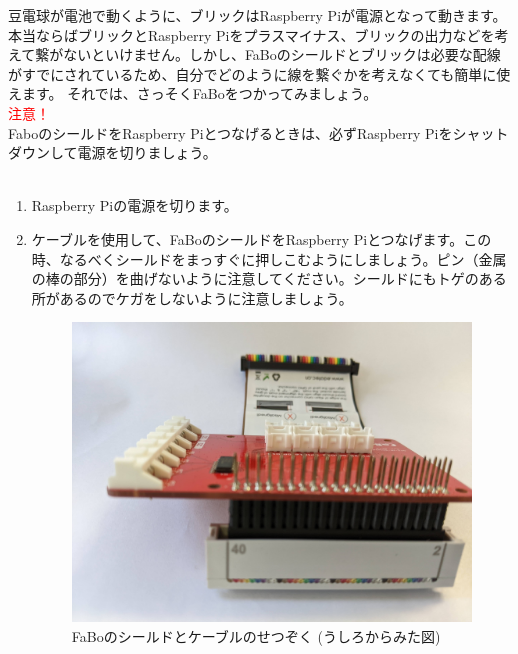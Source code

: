 豆電球が電池で動くように、ブリックはRaspberry Piが電源となって動きます。本当ならばブリックとRaspberry Piをプラスマイナス、ブリックの出力などを考えて繋がないといけません。しかし、FaBoのシールドとブリックは必要な配線がすでにされているため、自分でどのように線を繋ぐかを考えなくても簡単に使えます。
それでは、さっそくFaBoをつかってみましょう。\\

{\Large\textcolor{red}{注意！}}\\
FaboのシールドをRaspberry Piとつなげるときは、必ずRaspberry Piをシャットダウンして電源を切りましょう。\\
\\
\begin{enumerate}
\item Raspberry Piの電源を切ります。\\
\item ケーブルを使用して、FaBoのシールドをRaspberry Piとつなげます。この時、なるべくシールドをまっすぐに押しこむようにしましょう。ピン（金属の棒の部分）を曲げないように注意してください。シールドにもトゲのある所があるのでケガをしないように注意しましょう。\\
\begin{figure}[H]
    \centering
    \includegraphics[width=\hsize/2]{images/chap05/fabo_and_cable_rearview.jpg}
    \caption{FaBoのシールドとケーブルのせつぞく (うしろからみた図)}
\end{figure}
\begin{figure}[H]
    \centering

\end{figure}
\end{enumerate}
